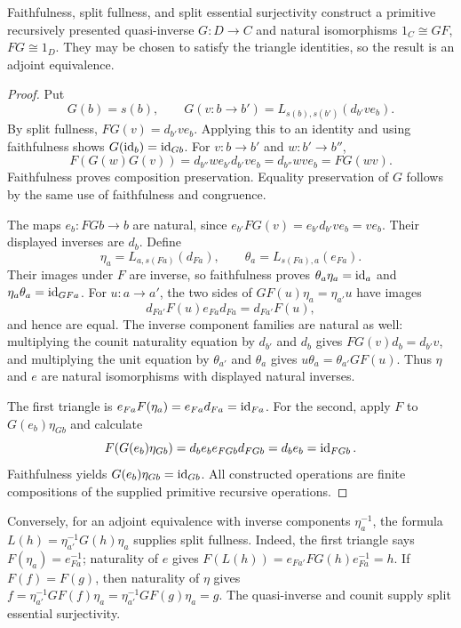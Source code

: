 \begin{theorem}\label{thm:split-equivalence}
Faithfulness, split fullness, and split essential surjectivity construct a
primitive recursively presented quasi-inverse $G:D\to C$ and natural
isomorphisms $1_C\cong GF$, $FG\cong1_D$.  They may be chosen to satisfy
the triangle identities, so the result is an adjoint equivalence.
\end{theorem}
\begin{proof}
Put
\[
 G(b)=s(b),\qquad G(v:b\to b')=L_{s(b),s(b')}(d_{b'}ve_b).
\]
By split fullness,
$FG(v)=d_{b'}ve_b$.  Applying this to an identity and using faithfulness
shows $G(\operatorname{id}_b)=\operatorname{id}_{Gb}$.  For $v:b\to b'$ and $w:b'\to b''$,
\[
 F(G(w)G(v))
 =d_{b''}we_{b'}d_{b'}ve_b
 =d_{b''}wve_b=FG(wv).
\]
Faithfulness proves composition preservation.  Equality preservation of
$G$ follows by the same use of faithfulness and congruence.

The maps $e_b:FGb\to b$ are natural, since
$e_{b'}FG(v)=e_{b'}d_{b'}ve_b=ve_b$.  Their displayed inverses are $d_b$.
Define
\[
 \eta_a=L_{a,s(Fa)}(d_{Fa}),\qquad
 \theta_a=L_{s(Fa),a}(e_{Fa}).
\]
Their images under $F$ are inverse, so faithfulness proves
$\theta_a\eta_a=\operatorname{id}_a$ and $\eta_a\theta_a=\operatorname{id}_{GFa}$.  For
$u:a\to a'$, the two sides of $GF(u)\eta_a=\eta_{a'}u$ have images
\[
 d_{Fa'}F(u)e_{Fa}d_{Fa}=d_{Fa'}F(u),
\]
and hence are equal.  The inverse component families are natural as well:
multiplying the counit naturality equation by $d_{b'}$ and $d_b$ gives
$FG(v)d_b=d_{b'}v$, and multiplying the unit equation by $\theta_{a'}$
and $\theta_a$ gives $u\theta_a=\theta_{a'}GF(u)$.
Thus $\eta$ and $e$ are natural isomorphisms with displayed natural inverses.

The first triangle is
$e_{Fa}F(\eta_a)=e_{Fa}d_{Fa}=\operatorname{id}_{Fa}$.
For the second, apply $F$ to $G(e_b)\eta_{Gb}$ and calculate
\[
 F(G(e_b)\eta_{Gb})
 =d_be_be_{FGb}d_{FGb}=d_be_b=\operatorname{id}_{FGb}.
\]
Faithfulness yields $G(e_b)\eta_{Gb}=\operatorname{id}_{Gb}$.  All constructed operations
are finite compositions of the supplied primitive recursive operations.
\end{proof}

Conversely, for an adjoint equivalence with inverse components $\eta_a^{-1}$,
the formula $L(h)=\eta_{a'}^{-1}G(h)\eta_a$ supplies split fullness.  Indeed,
the first triangle says $F(\eta_a)=e_{Fa}^{-1}$; naturality of $e$ gives
$F(L(h))=e_{Fa'}FG(h)e_{Fa}^{-1}=h$.  If $F(f)=F(g)$, then naturality of
$\eta$ gives
$f=\eta_{a'}^{-1}GF(f)\eta_a
 =\eta_{a'}^{-1}GF(g)\eta_a=g$.
The quasi-inverse and counit supply split essential surjectivity.

